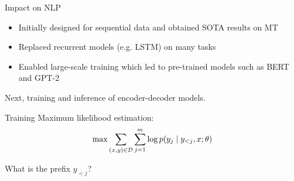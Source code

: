 \documentclass[usenames,dvipsnames,notes,11pt,aspectratio=169,hyperref={colorlinks=true, linkcolor=blue}]{beamer}
\begin{document}
\begin{frame}
    {Impact on NLP}
    \begin{itemize}
        \itemsep1em
        \item Initially designed for sequential data and obtained SOTA results on MT
        \item Replaced recurrent models (e.g. LSTM) on many tasks
        \item Enabled large-scale training which led to pre-trained models such as BERT and GPT-2
    \end{itemize}

    Next, training and inference of encoder-decoder models.
\end{frame}


\begin{frame}
    {Training}
    Maximum likelihood estimation:\\
    $$
    \max \sum_{(x,y)\in\mathcal{D}} \sum_{j=1}^m \log p(y_j\mid y_{<j}, x; \theta)
    $$
    \pause

    What is the prefix $y_{<j}$?\\[1ex]\pause
\end{frame}
\end{document}
